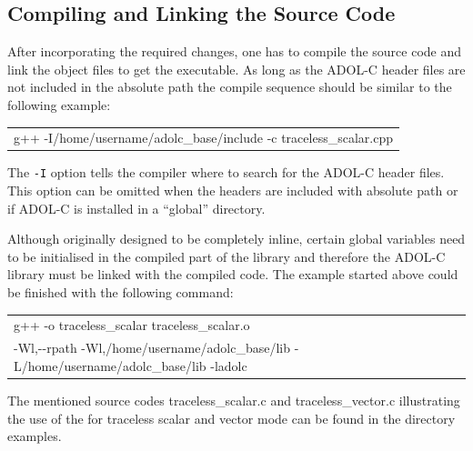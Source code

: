 \documentclass[11pt,twoside]{article}
\begin{document}
\subsection{Compiling and Linking the Source Code}
%
After incorporating the required changes, one has to compile the
source code and link the object files to get the executable. 
As long as the ADOL-C header files are not included in the absolute path
the compile sequence should be similar to the following example:
\begin{center}
  \begin{tabular}{l}
    {\sf g++ -I/home/username/adolc\_base/include -c traceless\_scalar.cpp}
  \end{tabular}
\end{center}
The \verb#-I# option tells the compiler where to search for the ADOL-C
header files. This option can be omitted when the headers are included
with absolute path or if ADOL-C is installed in a ``global'' directory. 

Although originally designed to be completely inline, certain global
variables need to be initialised in the compiled part of the library
and therefore the ADOL-C library must be linked with the compiled code.
The example started above could be finished with the
following command:
\begin{center}
  \begin{tabular}{l}
    {\sf g++ -o traceless\_scalar traceless\_scalar.o}\\
    {\sf -Wl,-{}-rpath -Wl,/home/username/adolc\_base/lib -L/home/username/adolc\_base/lib -ladolc}
  \end{tabular}
\end{center}
The mentioned source codes {\sf traceless\_scalar.c} and {\sf traceless\_vector.c} 
illustrating the use of the for traceless scalar and vector mode can be found in
the directory {\sf examples}. 
%
\end{document}

